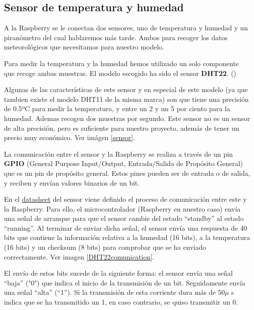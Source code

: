 \subsection{Sensor de temperatura y humedad}
\label{makereference2.2.2}

A la Raspberry se le conectan dos sensores, uno de temperatura y humedad y un piranómetro del cual hablaremos más tarde. Ambos para recoger los datos meteorológicos que necesitamos para nuestro modelo.

Para medir la temperatura y la humedad hemos utilizado un solo componente que recoge ambas muestras. El modelo escogido ha sido el sensor \textbf{DHT22}. (\cite{ARP:Adafruit:2017})

Algunas de las características de este sensor y en especial de este modelo (ya que tambien existe el modelo DHT11 de la misma marca) son que tiene una precisión de 0.5ºC para medir la temperatura, y entre un 2 y un 5 por ciento para la humedad. Ademas recogen dos muestras por segundo. Este sensor no es un sensor de alta precisión, pero es suficiente para nuestro proyecto, además de tener un precio muy económico. Ver imágen \ref{sensor}.

La comunicación entre el sensor y la Raspberry se realiza a través de un pin \textbf{GPIO} (General Purpose Input/Output, Entrada/Salida de Propósito General) que es un pin de propósito general. Estos pines pueden ser de entrada o de salida, y reciben y envían valores binarios de un bit.

En el \href{https://cdn-shop.adafruit.com/datasheets/Digital+humidity+and+temperature+sensor+AM2302.pdf}{datasheet} del sensor viene definido el proceso de comunicación entre este y la Raspberry. Para ello, el microcontrolador (Raspberry en nuestro caso) envía una señal de arranque para que el sensor cambie del estado ``standby'' al estado ``running''. Al terminar de enviar dicha señal, el sensor envía una respuesta de 40 bits que contiene la información relativa a la humedad (16 bits), a la temperatura (16 bits) y un checksum (8 bits) para comprobar que se ha enviado correctamente. Ver imagen \ref{DHT22comunication}.

El envío de estos bits sucede de la siguiente forma: el sensor envía una señal ``baja'' ("0") que indica el inicio de la transmisión de un bit. Seguidamente envía una señal ``alta'' (``1''). Si la transmisión de esta corriente dura más de $ 50 \mu $ s indica que se ha transmitido un 1, en caso contrario, se quiso transmitir un 0.

